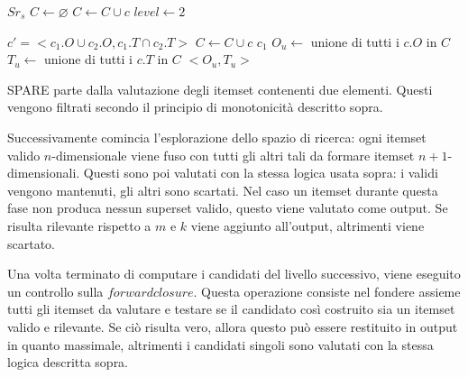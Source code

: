 \begin{algorithm}[H]
\caption{\( Apriori Enumerator\)}\label{alg:apriori-enumerator}
\begin{algorithmic}[1]
\Require \(Sr_s\)
\State \(C \gets \varnothing\)
 
         
            \State \(C \gets C \cup c\)  
        \EndIf
    \EndFor
\State \(level \gets 2\)  

         
            \State \(c' = <c_1.O \cup c_2.O, c_1.T \cap c_2.T>\) 
                  
                    \State \(C \gets C \cup c\)  
                \EndIf
        \EndFor
            \State \Return \(c_1\)  
        \EndIf
    \EndFor
    \State \(O_u \gets \) unione di tutti i \(c.O\) in \(C\)
    \State \(T_u \gets \) unione di tutti i \(c.T\) in \(C\)
      
            \State \Return \(<O_u, T_u>\)  
        \EndIf
\EndWhile

\end{algorithmic}
\end{algorithm}

SPARE parte dalla valutazione degli itemset contenenti due elementi.
Questi vengono filtrati secondo il principio di monotonicità descritto sopra.

Successivamente comincia l'esplorazione dello spazio di ricerca: ogni itemset valido \(n\)-dimensionale viene fuso con tutti gli altri tali da formare 
itemset \(n+1\)-dimensionali.
Questi sono poi valutati con la stessa logica usata sopra: i validi vengono mantenuti, gli altri sono scartati.
Nel caso un itemset durante questa fase non produca nessun superset valido, questo viene valutato come output.
Se risulta rilevante rispetto a \(m\) e \(k\) viene aggiunto all'output, altrimenti viene scartato.

Una volta terminato di computare i candidati del livello successivo, viene eseguito un controllo sulla \(forward closure\).
Questa operazione consiste nel fondere assieme tutti gli itemset da valutare e testare se il candidato così costruito sia un itemset valido e rilevante.
Se ciò risulta vero, allora questo può essere restituito in output in quanto massimale, altrimenti i candidati singoli sono valutati con la stessa logica descritta sopra.

